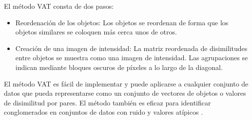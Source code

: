 El método VAT consta de dos pasos:

\begin{itemize}
 	\item Reordenación de los objetos: Los objetos se reordenan de forma que los objetos similares se coloquen más cerca unos de otros.
 	\item Creación de una imagen de intensidad: La matriz reordenada de disimilitudes entre objetos se muestra como una imagen de intensidad. Las agrupaciones se indican mediante bloques oscuros de píxeles a lo largo de la diagonal.
\end{itemize}

El método VAT es fácil de implementar y puede aplicarse a cualquier conjunto de datos que pueda representarse como un conjunto de vectores de objetos o valores de disimilitud por pares. El método también es eficaz para identificar conglomerados en conjuntos de datos con ruido y valores atípicos \cite{VAT}.

